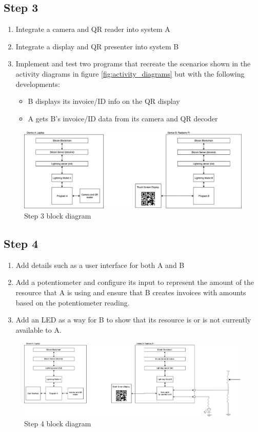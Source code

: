 \subsection{Step 3}

\begin{enumerate}[label=\alph*)]
    \item Integrate a camera and QR reader into system A
    \item Integrate a display and QR presenter into system B
    \item Implement and test two programs that recreate the scenarios shown in the activity diagrams in figure \ref{fig:activity_diagrams} but with the following developments:
        \begin{itemize}
            \item B displays its invoice/ID info on the QR display
            \item A gets B’s invoice/ID data from its camera and QR decoder
        \end{itemize}
\end{enumerate}

\begin{figure}[h!]
\centering
\includegraphics[scale=0.5]{Figures/step3.jpg}
\caption{Step 3 block diagram}
\label{fig:step3}
\end{figure}

\subsection{Step 4}

\begin{enumerate}[label=\alph*)]
    \item Add details such as a user interface for both A and B
    \item Add a potentiometer and configure its input to represent the amount of the resource that A is using and ensure that B creates invoices with amounts based on the potentiometer reading.
    \item Add an LED as a way for B to show that its resource is or is not currently available to A.
\end{enumerate}

\begin{figure}[h!]
\centering
\includegraphics[scale=0.5]{Figures/step4.jpg}
\caption{Step 4 block diagram}
\label{fig:step4}
\end{figure}